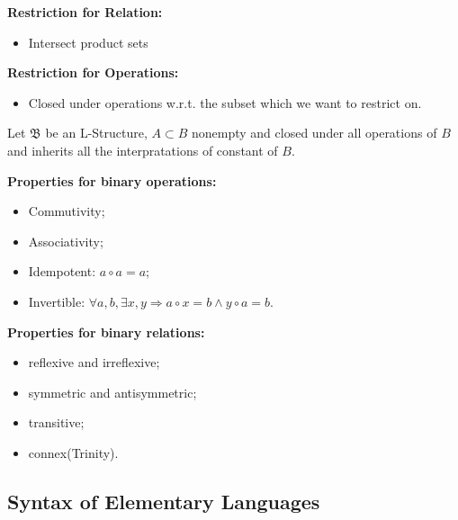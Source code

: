 \documentclass[11pt]{article}
\begin{document}
\begin{definition}
\textbf{Restriction for Relation:}
\begin{itemize}
\item Intersect product sets
\end{itemize}
\textbf{Restriction for Operations:}
\begin{itemize}
\item Closed under operations w.r.t. the subset which we want to restrict on.
\end{itemize}
\end{definition}

\begin{definition}[Substructure]
Let \(\mathfrak{B}\) be an L-Structure, \(A \subset B\) nonempty and closed
under all operations of \(B\) and inherits all the interpratations of constant of \(B\).
\end{definition}

\begin{proposition}
\textbf{Properties for binary operations:}
\begin{itemize}
\item Commutivity;
\item Associativity;
\item Idempotent: \(a \circ a = a\);
\item Invertible: \(\forall a,b, \exists x,y \Rightarrow a \circ x = b \land y \circ a = b\).
\end{itemize}

\textbf{Properties for binary relations:}
\begin{itemize}
\item reflexive and irreflexive;
\item symmetric and antisymmetric;
\item transitive;
\item connex(Trinity).
\end{itemize}
\end{proposition}
\subsection{Syntax of Elementary Languages}
\label{sec:org12bf8a7}
\end{document}
